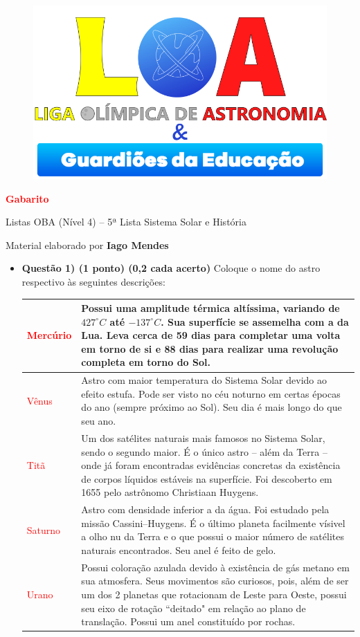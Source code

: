 \documentclass[a4paper, 12pt]{article}
\newcommand{\red}[1]{\textcolor{red}{#1}}
\newcommand{\cabecalho}[4]
{
	\begin{figure}
		\centering
		\href{https://ligaolimpicadeastronomia.com.br/}{\includegraphics[scale=0.6]{./img/logos.png}}
	\end{figure}
	
	\begin{center}
		\begin{large}
			\textbf{#1}	
		\end{large}
			\linebreak Listas OBA (Nível 4) -- #2ª Lista
			\linebreak #3
		\end{center}
	
	\begin{flushright}
		Material elaborado por \textbf{#4}
	\end{flushright}
}
\begin{document}
	\cabecalho{\red{Gabarito}}{5}{Sistema Solar e História}{Iago Mendes}
	
	\begin{flushleft}
	\begin{itemize}
		\item \textbf{Questão 1) (1 ponto) (0,2 cada acerto)} Coloque o nome do astro respectivo às seguintes descrições:
			\begin{center} \begin{tabular}{|M{0.2\textwidth}|M{0.65\textwidth}|}
				\hline
				\red{Mercúrio} & Possui uma amplitude térmica altíssima, variando de $427^{\circ}C$ até $-137^{\circ}C$. Sua superfície se assemelha com a da Lua. Leva cerca de 59 dias para completar uma volta em torno de si e 88 dias para realizar uma revolução completa em torno do Sol. \\ \hline
				\red{Vênus} & Astro com maior temperatura do Sistema Solar devido ao efeito estufa. Pode ser visto no céu noturno em certas épocas do ano (sempre próximo ao Sol). Seu dia é mais longo do que seu ano. \\ \hline
				\red{Titã} & Um dos satélites naturais mais famosos no Sistema Solar, sendo o segundo maior. É o único astro -- além da Terra -- onde já foram encontradas evidências concretas da existência de corpos líquidos estáveis na superfície. Foi descoberto em 1655 pelo astrônomo Christiaan Huygens. \\ \hline
				\red{Saturno} & Astro com densidade inferior a da água. Foi estudado pela missão Cassini–Huygens. É o último planeta facilmente vísivel a olho nu da Terra e o que possui o maior número de satélites naturais encontrados. Seu anel é feito de gelo. \\ \hline
				\red{Urano} & Possui coloração azulada devido à existência de gás metano em sua atmosfera. Seus movimentos são curiosos, pois, além de ser um dos 2 planetas que rotacionam de Leste para Oeste, possui seu eixo de rotação ``deitado" em relação ao plano de translação. Possui um anel constituído por rochas.\\ \hline
			\end{tabular} \end{center}


\end{itemize}
\end{flushleft}
\end{document}
